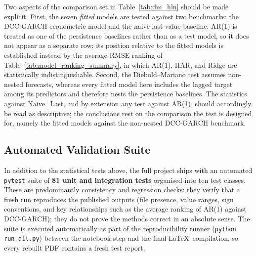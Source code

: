 Two aspects of the comparison set in Table~\ref{tab:dm_hln} should be made explicit.
First, the seven \emph{fitted} models are tested against two benchmarks: the DCC-GARCH
econometric model and the naive last-value baseline. AR(1) is treated as one of the
persistence baselines rather than as a test model, so it does not appear as a separate
row; its position relative to the fitted models is established instead by the
average-RMSE ranking of Table~\ref{tab:model_ranking_summary}, in which AR(1), HAR, and
Ridge are statistically indistinguishable. Second, the Diebold--Mariano test assumes
non-nested forecasts, whereas every fitted model here includes the lagged target among
its predictors and therefore nests the persistence baselines. The statistics against
Naive\_Last, and by extension any test against AR(1), should accordingly be read as
descriptive; the conclusions rest on the comparison the test is designed for, namely the
fitted models against the non-nested DCC-GARCH benchmark.

\subsection{Automated Validation Suite}
\label{subsec:auto_tests}

In addition to the statistical tests above, the full project ships with an
automated \texttt{pytest} suite of \textbf{81 unit and integration tests}
organised into ten test classes. These are predominantly consistency and regression
checks: they verify that a fresh run reproduces the published outputs (file presence,
value ranges, sign conventions, and key relationships such as the average ranking of
AR(1) against DCC-GARCH); they do not prove the methods correct in an absolute sense.
The suite is executed automatically as part of the reproducibility runner
(\texttt{python run\_all.py}) between the notebook step and the final
\LaTeX\ compilation, so every rebuilt PDF contains a fresh test report.

